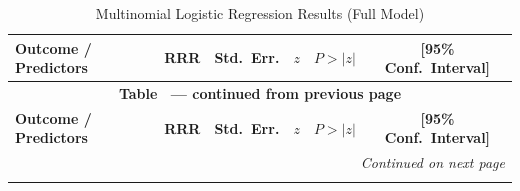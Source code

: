 {\footnotesize
\renewcommand{\arraystretch}{1.15}
\begin{longtable}{@{}l r r r r c c@{}}
\caption{Multinomial Logistic Regression Results (Full Model)}
\label{tab:mnl-full} \\
\toprule
\textbf{Outcome / Predictors} & \textbf{RRR} & \textbf{Std.\ Err.} & \textbf{$z$} & \textbf{$P>|z|$} & \multicolumn{2}{c}{\textbf{[95\% Conf.\ Interval]}} \\
\midrule
\endfirsthead
\multicolumn{7}{c}{\textbf{Table~\thetable{} --- continued from previous page}} \\
\toprule
\textbf{Outcome / Predictors} & \textbf{RRR} & \textbf{Std.\ Err.} & \textbf{$z$} & \textbf{$P>|z|$} & \multicolumn{2}{c}{\textbf{[95\% Conf.\ Interval]}} \\
\midrule
\endhead
\midrule
\multicolumn{7}{r}{\textit{Continued on next page}} \\
\bottomrule
\endfoot
\bottomrule
\endlastfoot


\end{longtable}}
